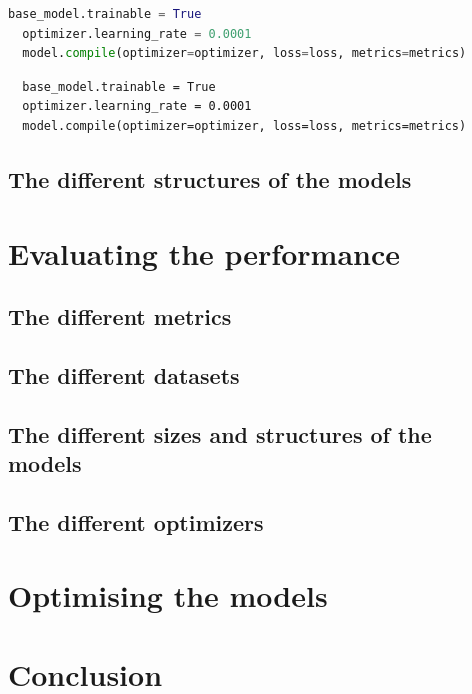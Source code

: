\documentclass[]{final_report}
\begin{document}
\begin{lstlisting}[language=Python]
  base_model.trainable = True
  optimizer.learning_rate = 0.0001
  model.compile(optimizer=optimizer, loss=loss, metrics=metrics)
\end{lstlisting}

\begin{verbatim}
  base_model.trainable = True
  optimizer.learning_rate = 0.0001
  model.compile(optimizer=optimizer, loss=loss, metrics=metrics)
\end{verbatim}

\section{The different structures of the models}

\chapter{Evaluating the performance}

\section{The different metrics}



\section{The different datasets}

\section{The different sizes and structures of the models}

\section{The different optimizers}

\chapter{Optimising the models}

\chapter{Conclusion}
\end{document}
